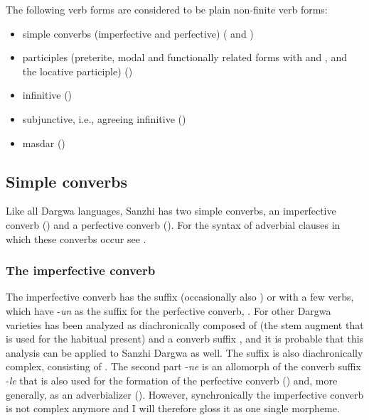The following verb forms are considered to be plain non-finite verb forms:
%
\begin{itemize}
	\item	simple converbs (imperfective and perfective) ( and )
	\item	participles (preterite, modal and functionally related forms with  and , and the locative participle) ()
	\item	infinitive ()
	\item	subjunctive, i.e., agreeing infinitive ()
	\item	masdar ()
\end{itemize}

%


 

\subsection{Simple converbs}
\label{ssec:Simple converbs}
Like all Dargwa languages, Sanzhi has two simple converbs, an imperfective converb () and a perfective converb (). For the syntax of adverbial clauses in which these converbs occur see .


\subsubsection{The imperfective converb}
\label{sssec:The imperfective converb}

The imperfective converb has the suffix  (occasionally also ) or with a few verbs, which have -\textit{un} as the suffix for the perfective converb, . For other Dargwa varieties  has been analyzed as diachronically composed of  (the stem augment that is used for the habitual present) and a converb suffix  \citep{Sumbatova.Mutalov2003, BelyaevInPreparation}, and it is probable that this analysis can be applied to Sanzhi Dargwa as well. The suffix  is also diachronically complex, consisting of . The second part -\textit{ne} is an allomorph of the converb suffix -\textit{le} that is also used for the formation of the perfective converb () and, more generally, as an adverbializer (). However, synchronically the imperfective converb is not complex anymore and I will therefore gloss it as one single morpheme.


